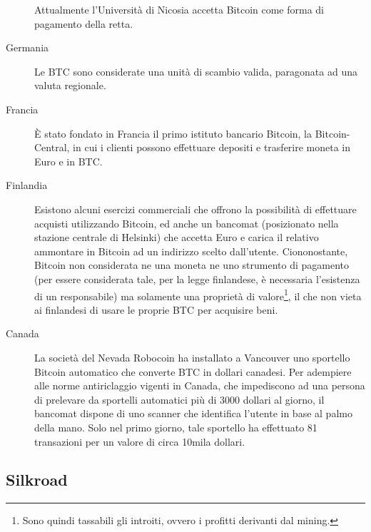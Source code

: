 \begin{description}
 Attualmente l'Università di Nicosia accetta Bitcoin come forma di pagamento della retta.
 \item[Germania] Le BTC sono considerate una unità di scambio valida, paragonata ad una valuta regionale.
 \item[Francia] È stato fondato in Francia il primo istituto bancario Bitcoin, la Bitcoin-Central, in cui i clienti possono effettuare depositi e trasferire moneta in Euro e in BTC.
 \item[Finlandia] Esistono alcuni esercizi commerciali che offrono la possibilità di effettuare acquisti utilizzando Bitcoin, ed anche un bancomat (posizionato nella stazione centrale di Helsinki) che accetta Euro e carica il relativo ammontare in Bitcoin ad un indirizzo scelto dall'utente. Ciononostante, Bitcoin non considerata ne una moneta ne uno strumento di pagamento (per essere considerata tale, per la legge finlandese, è necessaria l'esistenza di un responsabile) ma solamente una proprietà di valore\footnote{Sono quindi tassabili gli introiti, ovvero i profitti derivanti dal mining.}, il che non vieta ai finlandesi di usare le proprie BTC per acquisire beni.
 \item[Canada] La società del Nevada Robocoin ha installato a Vancouver uno sportello Bitcoin automatico che converte BTC in dollari canadesi. Per adempiere alle norme antiriclaggio vigenti in Canada, che impediscono ad una persona di prelevare da sportelli automatici più di 3000 dollari al giorno, il bancomat dispone di uno scanner che identifica l'utente in base al palmo della mano. Solo nel primo giorno, tale sportello ha effettuato 81 transazioni per un valore di circa 10mila dollari.
\end{description}

\subsection{Silkroad}\label{silkroad}

